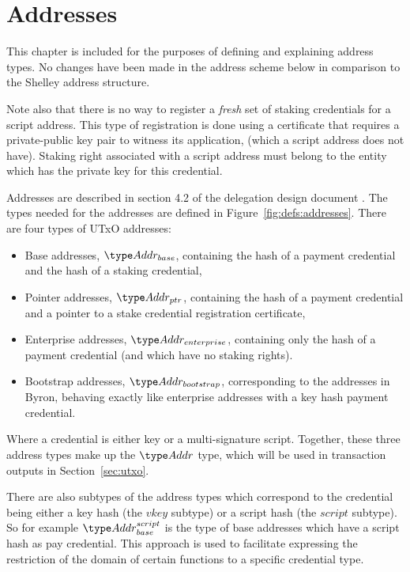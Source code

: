 \section{Addresses}
\label{sec:addresses}

\begin{note}
This chapter is included for the purposes of defining and explaining address types.
No changes have been made in the address scheme below in comparison to
the Shelley address structure.

Note also that there is no way to register a \textit{fresh} set of staking
credentials for a script address. This type of registration is done using
a certificate that requires a private-public key pair to witness its application,
(which a script address does not have). Staking right associated with
a script address must belong to the entity which has the private key for
this credential.
\end{note}

Addresses are described in section 4.2 of the delegation design document \cite{delegation_design}.
The types needed for the addresses are defined in Figure~\ref{fig:defs:addresses}.
There are four types of UTxO addresses:
\begin{itemize}
\item Base addresses, $\AddrB$, containing the hash of a payment credential and
  the hash of a staking credential,
\item Pointer addresses, $\AddrP$, containing the hash of a payment credential
  and a pointer to a stake credential registration certificate,
\item Enterprise addresses, $\AddrE$,
  containing only the hash of a payment credential (and which have no staking rights).
\item Bootstrap addresses, $\AddrBS$, corresponding to the addresses in
  Byron, behaving exactly like enterprise addresses with a key hash
  payment credential.
\end{itemize}

\noindent Where a credential is either key or a multi-signature script. Together, these
three address types make up the $\Addr$ type, which will be used in transaction
outputs in Section~\ref{sec:utxo}.

There are also subtypes of the address types which correspond to the credential
being either a key hash (the $vkey$ subtype) or a script hash (the $script$
subtype). So for example $\Addr_{base}^{script}$ is the type of base addresses
which have a script hash as pay credential. This approach is used to facilitate
expressing the restriction of the domain of certain functions to a specific
credential type.

